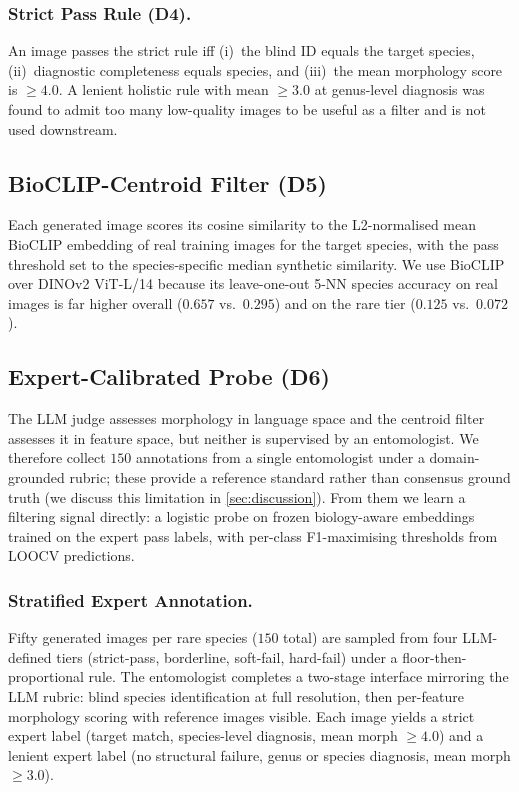\documentclass[runningheads]{llncs}
\begin{document}
\subsubsection{Strict Pass Rule (D4).}
An image passes the strict rule iff (i)~the blind ID equals the target
species, (ii)~diagnostic completeness equals species, and (iii)~the
mean morphology score is $\geq 4.0$. A lenient holistic rule with mean
$\geq 3.0$ at genus-level diagnosis was found to admit too many
low-quality images to be useful as a filter and is not used
downstream.

\subsection{BioCLIP-Centroid Filter (D5)}
\label{sec:centroid}

Each generated image scores its cosine similarity to the L2-normalised
mean BioCLIP embedding of real training images for the target species,
with the pass threshold set to the species-specific median synthetic
similarity. We use BioCLIP over DINOv2 ViT-L/14 because its leave-one-out
5-NN species accuracy on real images is far higher overall ($0.657$
vs.\ $0.295$) and on the rare tier ($0.125$ vs.\ $0.072$).

\subsection{Expert-Calibrated Probe (D6)}
\label{sec:probe}

The LLM judge assesses morphology in language space and the centroid
filter assesses it in feature space, but neither is supervised by an
entomologist. We therefore collect $150$ annotations from a single
entomologist under a domain-grounded rubric;
these provide a reference standard rather than consensus ground truth
(we discuss this limitation in \cref{sec:discussion}). From them we
learn a filtering signal directly: a logistic probe on frozen
biology-aware embeddings trained on the expert pass labels, with
per-class F1-maximising thresholds from LOOCV predictions.

\subsubsection{Stratified Expert Annotation.}
Fifty generated images per rare species ($150$ total) are sampled from
four LLM-defined tiers (strict-pass, borderline, soft-fail, hard-fail)
under a floor-then-proportional rule. The entomologist completes a
two-stage interface mirroring the LLM rubric:
blind species identification at full resolution, then per-feature
morphology scoring with reference images visible. Each image yields a
strict expert label (target match, species-level diagnosis, mean morph
$\geq 4.0$) and a lenient expert label (no structural failure, genus or
species diagnosis, mean morph $\geq 3.0$).
\end{document}
